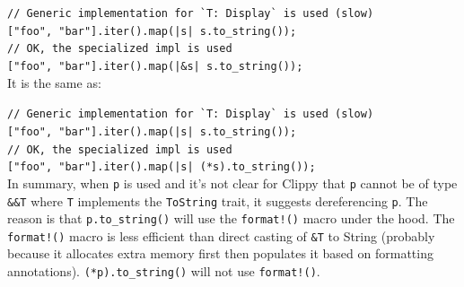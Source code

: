 \documentclass{article}
\begin{document}
\noindent\verb+// Generic implementation for `T: Display` is used (slow)+ \\
\verb+["foo", "bar"].iter().map(|s| s.to_string());+\\

\noindent\verb+// OK, the specialized impl is used+\\
\verb+["foo", "bar"].iter().map(|&s| s.to_string());+\\

It is the same as:

\noindent\verb+// Generic implementation for `T: Display` is used (slow)+\\
\verb+["foo", "bar"].iter().map(|s| s.to_string());+\\

\noindent\verb+// OK, the specialized impl is used+\\
\verb+["foo", "bar"].iter().map(|s| (*s).to_string());+\\

In summary, when \verb+p+ is used and it's not clear for Clippy that \verb+p+ cannot be of type \verb+&&T+ where \verb+T+ implements the \verb+ToString+ trait, it suggests dereferencing \verb+p+. The reason is that \verb+p.to_string()+ will use the \verb+format!()+ macro under the hood. The \verb+format!()+ macro is less efficient than direct casting of \verb+&T+ to String (probably because it allocates extra memory first then populates it based on formatting annotations). \verb+(*p).to_string()+ will not use \verb+format!()+.



% 
% 
\end{document}
